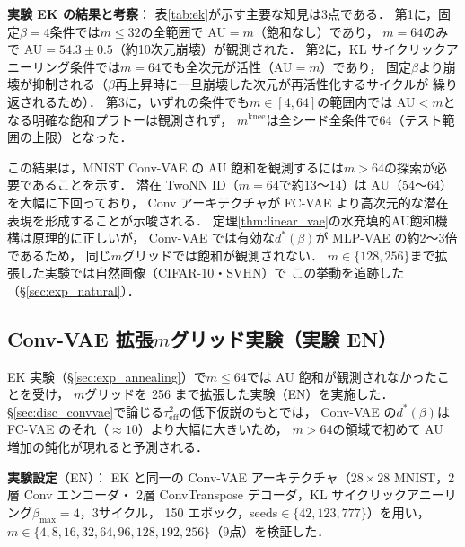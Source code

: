 \documentclass[11pt,a4paper]{jsarticle}
\newcommand{\mknee}{m^{\mathrm{knee}}}
\begin{document}
\textbf{実験 EK の結果と考察}：
表\ref{tab:ek}が示す主要な知見は3点である．
第1に，固定$\beta=4$条件では$m \le 32$の全範囲で AU$=m$（飽和なし）であり，
$m=64$のみで AU$=54.3\pm0.5$（約10次元崩壊）が観測された．
第2に，KL サイクリックアニーリング条件では$m=64$でも全次元が活性（AU$=m$）であり，
固定$\beta$より崩壊が抑制される（$\beta$再上昇時に一旦崩壊した次元が再活性化するサイクルが
繰り返されるため）．
第3に，いずれの条件でも$m \in [4,64]$の範囲内では AU$<m$となる明確な飽和プラトーは観測されず，
$\mknee$は全シード全条件で64（テスト範囲の上限）となった．

この結果は，MNIST Conv-VAE の AU 飽和を観測するには$m > 64$の探索が必要であることを示す．
潜在 TwoNN ID（$m=64$で約13〜14）は AU（54〜64）を大幅に下回っており，
Conv アーキテクチャが FC-VAE より高次元的な潜在表現を形成することが示唆される．
定理\ref{thm:linear_vae}の水充填的AU飽和機構は原理的に正しいが，
Conv-VAE では有効な$d^*(\beta)$が MLP-VAE の約2〜3倍であるため，
同じ$m$グリッドでは飽和が観測されない．
$m \in \{128, 256\}$まで拡張した実験では自然画像（CIFAR-10・SVHN）で
この挙動を追跡した（§\ref{sec:exp_natural}）．

\subsection{Conv-VAE 拡張$m$グリッド実験（実験 EN）}\label{sec:exp_en}

EK 実験（§\ref{sec:exp_annealing}）で$m \leq 64$では AU 飽和が観測されなかったことを受け，
$m$グリッドを 256 まで拡張した実験（EN）を実施した．
§\ref{sec:disc_convvae}で論じる$\tau^2_\mathrm{eff}$の低下仮説のもとでは，
Conv-VAE の$d^*(\beta)$は FC-VAE のそれ（$\approx 10$）より大幅に大きいため，
$m>64$の領域で初めて AU 増加の鈍化が現れると予測される．

\textbf{実験設定}（EN）：
EK と同一の Conv-VAE アーキテクチャ（$28\times28$ MNIST，2層 Conv エンコーダ・
2層 ConvTranspose デコーダ，KL サイクリックアニーリング$\beta_\mathrm{max}=4$，3サイクル，
150 エポック，seeds$\in\{42,123,777\}$）を用い，
$m \in \{4, 8, 16, 32, 64, 96, 128, 192, 256\}$（9点）を検証した．
\end{document}
